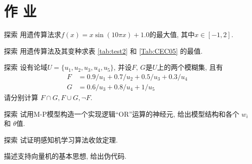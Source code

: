 \section{作      业}
\begin{custom}[explorecolor]{探索}
    用遗传算法求$f(x)=x\sin(10πx)+1.0$的最大值, 其中$x\in [-1,2]$.
\end{custom}
\begin{custom}[explorecolor]{探索}
    用遗传算法及其变种求表 \ref{tab:test2} 和 \ref{Tab:CEC05} 的最值.
\end{custom}
\begin{custom}[explorecolor]{探索}
设有论域$U=\{u_1, u_2, u_3, u_4, u_5\}$, 并设$F,\, G$是$U$上的两个模糊集, 且有
\begin{align*}
    F&=0.9/u_1+0.7/u_2+0.5/u_3+0.3/u_4\\
    G&=0.6/u_3+0.8/u_4+1/u_5
\end{align*}
请分别计算 $F\cap G, F\cup G,\neg F$.
\end{custom}
\begin{custom}[explorecolor]{探索}
    试用M-P模型构造一个实现逻辑``OR''运算的神经元, 给出模型结构和各个 $w_{i}$和 $\theta $值.
\end{custom}
\begin{custom}[explorecolor]{探索}
    试证明感知机学习算法收敛定理.
\end{custom}
\begin{think}
    描述支持向量机的基本思想, 给出伪代码.
\end{think}

